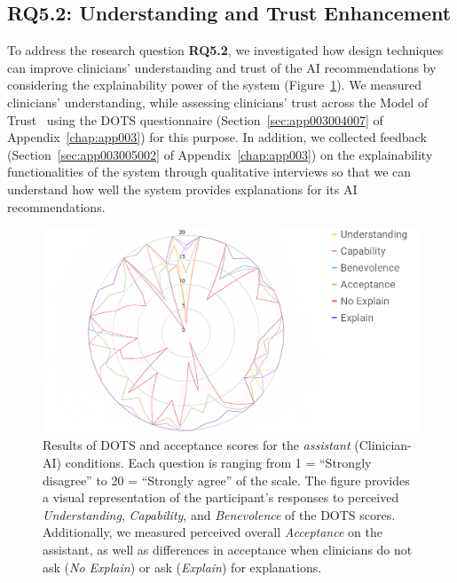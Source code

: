 \subsection{RQ5.2: Understanding and Trust Enhancement}
\label{sec:chap005006002}

To address the research question {\bf RQ5.2}, we investigated how design techniques can improve clinicians' understanding and trust of the \ac{AI} recommendations by considering the explainability power of the system (Figure~\ref{fig:fig111}).
We measured clinicians' understanding, while assessing clinicians' trust across the Model of Trust~\cite{CALISTO2021102607} using the \ac{DOTS} questionnaire (Section~\ref{sec:app003004007} of Appendix~\ref{chap:app003}) for this purpose.
In addition, we collected feedback (Section~\ref{sec:app003005002} of Appendix~\ref{chap:app003}) on the explainability functionalities of the system through qualitative interviews so that we can understand how well the system provides explanations for its \ac{AI} recommendations.

\begin{figure}[htbp]
\centering
\includegraphics[width=\columnwidth]{images/fig111}
\caption{Results of DOTS and acceptance scores for the {\it assistant} (Clinician-AI) conditions. Each question is ranging from 1 = ``Strongly disagree'' to 20 = ``Strongly agree'' of the scale. The figure provides a visual representation of the participant's responses to perceived {\it Understanding}, {\it Capability}, and {\it Benevolence} of the DOTS scores. Additionally, we measured perceived overall {\it Acceptance} on the assistant, as well as differences in acceptance when clinicians do not ask ({\it No Explain}) or ask ({\it Explain}) for explanations.}
\label{fig:fig111}
\end{figure}

